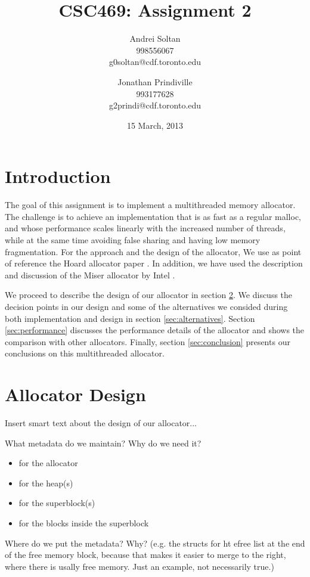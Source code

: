 \documentclass{article}
\author{Andrei Soltan\\998556067\\g0soltan@cdf.toronto.edu
\and Jonathan Prindiville\\993177628\\g2prindi@cdf.toronto.edu}
\title{CSC469: Assignment 2}
\date{15 March, 2013}
\begin{document}
\maketitle

\tableofcontents

\newpage
\section{Introduction}

The goal of this assignment is to implement a multithreaded memory allocator.
The challenge is to achieve an implementation that is as fast as a regular 
malloc, and whose performance scales linearly with the increased number of
threads, while at the same time avoiding false sharing and having low 
memory fragmentation. For the approach and the design of the allocator, 
We use as point of reference the Hoard allocator paper \cite{berger00}.
In addition, we have used the description and discussion of the Miser allocator
by Intel \cite{miser-intel}.

We proceed to describe the design of our allocator in section \ref{sec:design}. 
We discuss the decision points in our design and some of the alternatives we 
consided during both implementation and design in section \ref{sec:alternatives}.
Section \ref{sec:performance} discusses the performance details of the allocator
and shows the comparison with other allocators. Finally, section 
\ref{sec:conclusion} presents our conclusions on this multithreaded allocator.

\newpage
\section{Allocator Design}
\label{sec:design}

Insert smart text about the design of our allocator...

What metadata do we maintain? Why do we need it?
\begin{itemize}
	\item for the allocator
	\item for the heap(s)
	\item for the superblock(s)
	\item for the blocks inside the superblock
\end{itemize}

Where do we put the metadata? Why? (e.g. the structs for ht efree list at the 
end of the free memory block, because that makes it easier to merge to the 
right, where there is usally free memory. Just an example, not necessarily true.)
\end{document}
